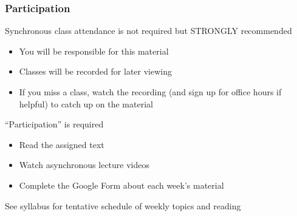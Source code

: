 \documentclass{beamer}
\begin{document}
\begin{frame}\frametitle{Participation}
    Synchronous class attendance is not required but STRONGLY recommended
    \begin{itemize}
        \item You will be responsible for this material
        \item Classes will be recorded for later viewing
        \item If you miss a class, watch the recording (and sign up for office hours if helpful) to catch up on the material
    \end{itemize}
    \vspace{2ex}
    ``Participation'' is required
    \begin{itemize}
        \item Read the assigned text
        \item Watch asynchronous lecture videos
        \item Complete the Google Form about each week's material
    \end{itemize}
    \vspace{2ex}
    See syllabus for tentative schedule of weekly topics and reading
\end{frame}
\end{document}
